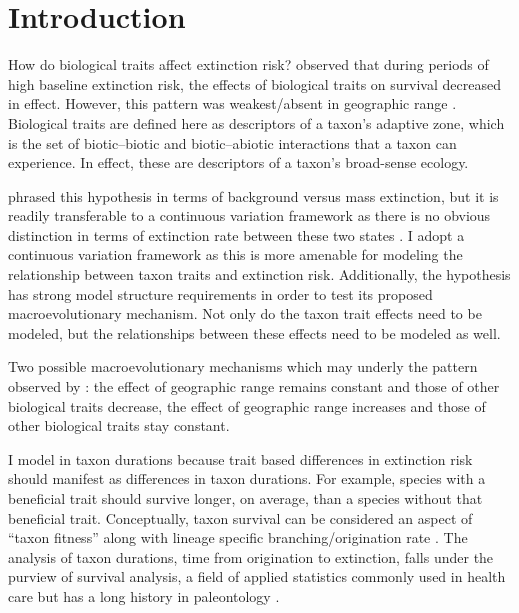 \documentclass[12pt,letterpaper]{article}
\begin{document}
\section{Introduction}

How do biological traits affect extinction risk? \citet{Jablonski1986} observed that during periods of high baseline extinction risk, the effects of biological traits on survival decreased in effect. However, this pattern was weakest/absent in geographic range \citep{Jablonski1986}. Biological traits are defined here as descriptors of a taxon's adaptive zone, which is the set of biotic--biotic and biotic--abiotic interactions that a taxon can experience. In effect, these are descriptors of a taxon's broad-sense ecology.

\citet{Jablonski1986} phrased this hypothesis in terms of background versus mass extinction, but it is readily transferable to a continuous variation framework as there is no obvious distinction in terms of extinction rate between these two states \citep{Wang2003}. I adopt a continuous variation framework as this is more amenable for modeling the relationship between taxon traits and extinction risk. Additionally, the \citet{Jablonski1986} hypothesis has strong model structure requirements in order to test its proposed macroevolutionary mechanism. Not only do the taxon trait effects need to be modeled, but the relationships between these effects need to be modeled as well. 

Two possible macroevolutionary mechanisms which may underly the pattern observed by \citet{Jablonski1986}: the effect of geographic range remains constant and those of other biological traits decrease, the effect of geographic range increases and those of other biological traits stay constant. 

I model in taxon durations because trait based differences in extinction risk should manifest as differences in taxon durations. For example, species with a beneficial trait should survive longer, on average, than a species without that beneficial trait. Conceptually, taxon survival can be considered an aspect of ``taxon fitness'' along with lineage specific branching/origination rate \citep{Cooper1984,Palmer2012}. The analysis of taxon durations, time from origination to extinction, falls under the purview of survival analysis, a field of applied statistics commonly used in health care \citep{Klein2003} but has a long history in paleontology \citep{Simpson1944,Simpson1953,VanValen1973,VanValen1979}.
\end{document}
